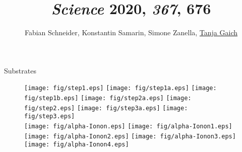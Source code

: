 \documentclass[aspectratio=169]{beamer}
\begin{document}
\title{\textit{Science} \textbf{2020}, \textit{367}, 676}
 \author{Fabian Schneider, Konstantin Samarin, Simone Zanella, \underline{Tanja Gaich}}
 \date{}
\begin{frame}
\maketitle
\end{frame}

\begin{frame}{Substrates}

\begin{figure}
    \texttt{[image: fig/step1.eps]}
    \texttt{[image: fig/step1a.eps]}
    \pause
    \texttt{[image: fig/step1b.eps]}
    \pause
    \texttt{[image: fig/step2a.eps]}
    \texttt{[image: fig/step2.eps]}
    \pause
    \texttt{[image: fig/step3a.eps]}
    \pause
    \texttt{[image: fig/step3.eps]}\\
    \pause
    \texttt{[image: fig/alpha-Ionon.eps]}
            \pause
    \texttt{[image: fig/alpha-Ionon1.eps]}
        \pause
    \texttt{[image: fig/alpha-Ionon2.eps]}
            \pause
    \texttt{[image: fig/alpha-Ionon3.eps]}
            \pause
    \texttt{[image: fig/alpha-Ionon4.eps]}

\end{figure}
\end{frame}

\begin{frame}
    \\
    \hfill
    \\
    \hfill
    \hspace{20pt}
\end{frame}
\end{document}
